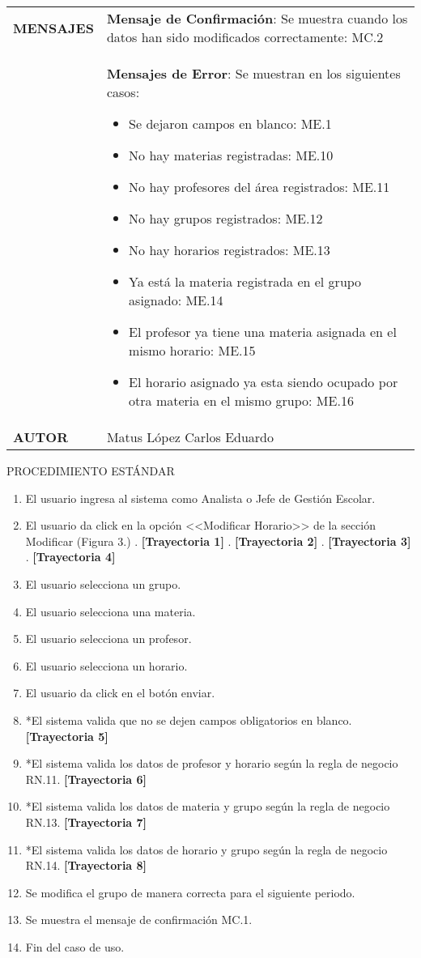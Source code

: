 \newpage
\begin{longtable}{ | p{6cm} | p{10cm} |}
\hline
\textbf{MENSAJES} & \textbf{Mensaje de Confirmación}: Se muestra cuando los datos han sido modificados correctamente: MC.2\\ & \textbf{Mensajes de Error}: Se muestran en los siguientes casos: \begin{itemize}
    \item Se dejaron campos en blanco: ME.1
    \item No hay materias registradas: ME.10
    \item No hay profesores del área registrados: ME.11
    \item No hay grupos registrados: ME.12
    \item No hay horarios registrados: ME.13
    \item Ya está la materia registrada en el grupo asignado: ME.14
    \item El profesor ya tiene una materia asignada en el mismo horario: ME.15
    \item El horario asignado ya esta siendo ocupado por otra materia en el mismo grupo: ME.16
\end{itemize}\\
\hline
\textbf{AUTOR} & Matus López Carlos Eduardo\\
\hline
\end{longtable}
\vspace*{1cm}
\noindent
\Large{PROCEDIMIENTO ESTÁNDAR}
\large{}
\begin{enumerate}
    \item El usuario ingresa al sistema como Analista o Jefe de Gestión Escolar.
    \item El usuario da click en la opción <<Modificar Horario>> de la sección Modificar (Figura 3.) . \textbf{[Trayectoria 1]} . \textbf{[Trayectoria 2]} . \textbf{[Trayectoria 3]} . \textbf{[Trayectoria 4]}
    \item El usuario selecciona un grupo.  
  \item El usuario selecciona una materia.
    \item El usuario selecciona un profesor.
    \item El usuario selecciona un horario.
    \item El usuario da click en el botón enviar.
    \item *El sistema valida que no se dejen campos obligatorios en blanco. \textbf{[Trayectoria 5]}
    \item *El sistema valida los datos de profesor y horario según la regla de negocio RN.11. \textbf{[Trayectoria 6]}
    \item *El sistema valida los datos de materia y grupo según la regla de negocio RN.13. \textbf{[Trayectoria 7]}
    \item *El sistema valida los datos de horario y grupo según la regla de negocio RN.14. \textbf{[Trayectoria 8]}
    \item Se modifica el grupo de manera correcta para el siguiente periodo.
    \item Se muestra el mensaje de confirmación MC.1.
    \item Fin del caso de uso.
\end{enumerate}
